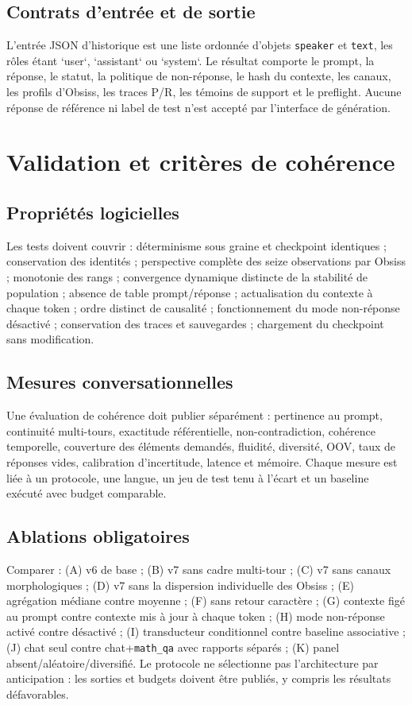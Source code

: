 \documentclass[11pt,a4paper]{report}
\begin{document}
\section{Contrats d'entrée et de sortie}
L'entrée JSON d'historique est une liste ordonnée d'objets \texttt{speaker} et \texttt{text}, les rôles étant `user`, `assistant` ou `system`. Le résultat comporte le prompt, la réponse, le statut, la politique de non-réponse, le hash du contexte, les canaux, les profils d'Obsiss, les traces P/R, les témoins de support et le preflight. Aucune réponse de référence ni label de test n'est accepté par l'interface de génération.

\chapter{Validation et critères de cohérence}
\section{Propriétés logicielles}
Les tests doivent couvrir : déterminisme sous graine et checkpoint identiques ; conservation des identités ; perspective complète des seize observations par Obsiss ; monotonie des rangs ; convergence dynamique distincte de la stabilité de population ; absence de table prompt/réponse ; actualisation du contexte à chaque token ; ordre distinct de causalité ; fonctionnement du mode non-réponse désactivé ; conservation des traces et sauvegardes ; chargement du checkpoint sans modification.

\section{Mesures conversationnelles}
Une évaluation de cohérence doit publier séparément : pertinence au prompt, continuité multi-tours, exactitude référentielle, non-contradiction, cohérence temporelle, couverture des éléments demandés, fluidité, diversité, OOV, taux de réponses vides, calibration d'incertitude, latence et mémoire. Chaque mesure est liée à un protocole, une langue, un jeu de test tenu à l'écart et un baseline exécuté avec budget comparable.

\section{Ablations obligatoires}
Comparer : (A) v6 de base ; (B) v7 sans cadre multi-tour ; (C) v7 sans canaux morphologiques ; (D) v7 sans la dispersion individuelle des Obsiss ; (E) agrégation médiane contre moyenne ; (F) sans retour caractère ; (G) contexte figé au prompt contre contexte mis à jour à chaque token ; (H) mode non-réponse activé contre désactivé ; (I) transducteur conditionnel contre baseline associative ; (J) chat seul contre chat+\texttt{math\_qa} avec rapports séparés ; (K) panel absent/aléatoire/diversifié. Le protocole ne sélectionne pas l'architecture par anticipation : les sorties et budgets doivent être publiés, y compris les résultats défavorables.
\end{document}
